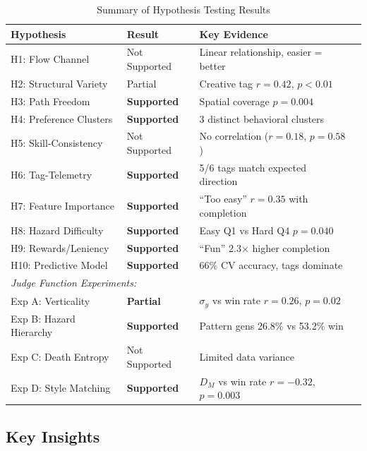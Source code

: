 \documentclass[11pt,a4paper]{article}
\theoremstyle{plain}
\theoremstyle{definition}
\theoremstyle{remark}
\begin{document}
\begin{table}[H]
\centering
\caption{Summary of Hypothesis Testing Results}
\label{tab:hypothesis-summary}
\begin{tabular}{llll}
\toprule
\textbf{Hypothesis} & \textbf{Result} & \textbf{Key Evidence} \\
\midrule
H1: Flow Channel & Not Supported & Linear relationship, easier = better \\
H2: Structural Variety & Partial & Creative tag $r = 0.42$, $p < 0.01$ \\
H3: Path Freedom & \textbf{Supported} & Spatial coverage $p = 0.004$ \\
H4: Preference Clusters & \textbf{Supported} & 3 distinct behavioral clusters \\
H5: Skill-Consistency & Not Supported & No correlation ($r = 0.18$, $p = 0.58$) \\
H6: Tag-Telemetry & \textbf{Supported} & 5/6 tags match expected direction \\
H7: Feature Importance & \textbf{Supported} & ``Too easy'' $r = 0.35$ with completion \\
H8: Hazard Difficulty & \textbf{Supported} & Easy Q1 vs Hard Q4 $p = 0.040$ \\
H9: Rewards/Leniency & \textbf{Supported} & ``Fun'' 2.3$\times$ higher completion \\
H10: Predictive Model & \textbf{Supported} & 66\% CV accuracy, tags dominate \\
\midrule
\multicolumn{3}{l}{\textit{Judge Function Experiments:}} \\
Exp A: Verticality & \textbf{Partial} & $\sigma_y$ vs win rate $r = 0.26$, $p = 0.02$ \\
Exp B: Hazard Hierarchy & \textbf{Supported} & Pattern gens 26.8\% vs 53.2\% win \\
Exp C: Death Entropy & Not Supported & Limited data variance \\
Exp D: Style Matching & \textbf{Supported} & $D_M$ vs win rate $r = -0.32$, $p = 0.003$ \\
\bottomrule
\end{tabular}
\end{table}

\subsection{Key Insights}
\label{subsec:key-insights}
\end{document}
